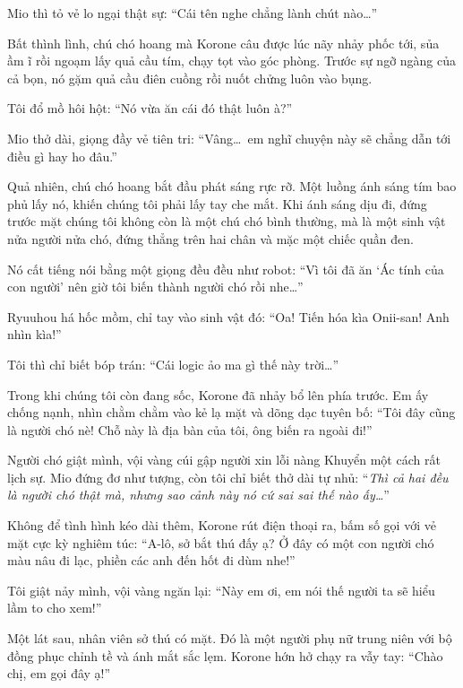\documentclass[../main.tex]{subfiles}
\begin{document}
Mio thì tỏ vẻ lo ngại thật sự: ``Cái tên nghe chẳng lành chút nào\dots''

Bất thình lình, chú chó hoang mà Korone câu được lúc nãy nhảy phốc tới, sủa ầm ĩ rồi ngoạm lấy quả cầu tím, chạy tọt vào góc phòng. Trước sự ngỡ ngàng của cả bọn, nó gặm quả cầu điên cuồng rồi nuốt chửng luôn vào bụng.

Tôi đổ mồ hôi hột: ``Nó vừa ăn cái đó thật luôn à?''

Mio thở dài, giọng đầy vẻ tiên tri: ``Vâng\dots\ em nghĩ chuyện này sẽ chẳng dẫn tới điều gì hay ho đâu.''

Quả nhiên, chú chó hoang bắt đầu phát sáng rực rỡ. Một luồng ánh sáng tím bao phủ lấy nó, khiến chúng tôi phải lấy tay che mắt. Khi ánh sáng dịu đi, đứng trước mặt chúng tôi không còn là một chú chó bình thường, mà là một sinh vật nửa người nửa chó, đứng thẳng trên hai chân và mặc một chiếc quần đen.


Nó cất tiếng nói bằng một giọng đều đều như robot: ``Vì tôi đã ăn `Ác tính của con người' nên giờ tôi biến thành người chó rồi nhe\dots''

Ryuuhou há hốc mồm, chỉ tay vào sinh vật đó: ``Oa! Tiến hóa kìa Onii-san! Anh nhìn kìa!''

Tôi thì chỉ biết bóp trán: ``Cái logic ảo ma gì thế này trời\dots''

Trong khi chúng tôi còn đang sốc, Korone đã nhảy bổ lên phía trước. Em ấy chống nạnh, nhìn chằm chằm vào kẻ lạ mặt và dõng dạc tuyên bố: ``Tôi đây cũng là người chó nè! Chỗ này là địa bàn của tôi, ông biến ra ngoài đi!''

Người chó giật mình, vội vàng cúi gập người xin lỗi nàng Khuyển một cách rất lịch sự. Mio đứng đơ như tượng, còn tôi chỉ biết thở dài tự nhủ: ``\textit{Thì cả hai đều là người chó thật mà, nhưng sao cảnh này nó cứ sai sai thế nào ấy\dots}''

Không để tình hình kéo dài thêm, Korone rút điện thoại ra, bấm số gọi với vẻ mặt cực kỳ nghiêm túc: ``A-lô, sở bắt thú đấy ạ? Ở đây có một con người chó màu nâu đi lạc, phiền các anh đến hốt đi dùm nhe!''

Tôi giật nảy mình, vội vàng ngăn lại: ``Này em ơi, em nói thế người ta sẽ hiểu lầm to cho xem!''

\ct

Một lát sau, nhân viên sở thú có mặt. Đó là một người phụ nữ trung niên với bộ đồng phục chỉnh tề và ánh mắt sắc lẹm. Korone hớn hở chạy ra vẫy tay: ``Chào chị, em gọi đây ạ!''
\end{document}
